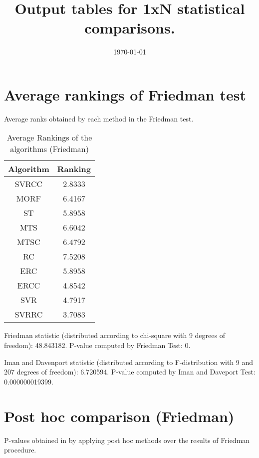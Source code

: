 \documentclass[a4paper,10pt]{article}
\title{Output tables for 1xN statistical comparisons.}
\author{}
\date{\today}
\begin{document}
\begin{landscape}
\pagestyle{empty}
\maketitle
\thispagestyle{empty}

\section{Average rankings of Friedman test}


Average ranks obtained by each method in the Friedman test.

\begin{table}[!htp]
\centering
\begin{tabular}{|c|c|}\hline
Algorithm&Ranking\\\hline
SVRCC&2.8333\\MORF&6.4167\\ST&5.8958\\MTS&6.6042\\MTSC&6.4792\\RC&7.5208\\ERC&5.8958\\ERCC&4.8542\\SVR&4.7917\\SVRRC&3.7083\\\hline\end{tabular}
\caption{Average Rankings of the algorithms (Friedman)}
\end{table}

Friedman statistic (distributed according to chi-square with 9 degrees of freedom): 48.843182. \newline P-value computed by Friedman Test: 0.\newline

Iman and Davenport statistic (distributed according to F-distribution with 9 and 207 degrees of freedom): 6.720594. \newline P-value computed by Iman and Daveport Test: 0.000000019399.\newline


\newpage

\section{Post hoc comparison (Friedman)}


P-values obtained in by applying post hoc methods over the results of Friedman procedure.


\end{landscape}
\end{document}
